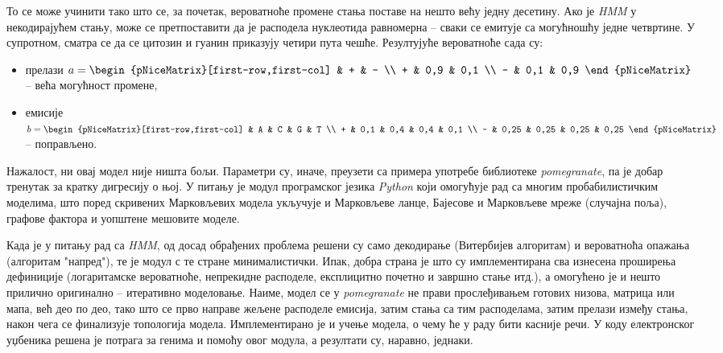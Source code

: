 \documentclass[12pt,oneside]{memoir}
\begin{document}
\begin{CJK}{UTF8}{ipxm}
То се може учинити тако што се, за почетак, вероватноће промене стања поставе на нешто већу једну десетину. Ако је \textit{HMM} у некодирајућем стању, може се претпоставити да је расподела нуклеотида равномерна -- сваки се емитује са могућношћу једне четвртине. У супротном, сматра се да се цитозин и гуанин приказују четири пута чешће. Резултујуће вероватноће сада су:
\begin{itemize}
  \item прелази $a = \begin{pNiceMatrix}[first-row,first-col] & + & - \\ + & 0,9 & 0,1 \\ - & 0,1 & 0,9 \end{pNiceMatrix}$ -- већа могућност промене,
  \item емисије $b = \begin{pNiceMatrix}[first-row,first-col] & A & C & G & T \\ + & 0,1 & 0,4 & 0,4 & 0,1 \\ - & 0,25 & 0,25 & 0,25 & 0,25 \end{pNiceMatrix}$ -- поправљено.
\end{itemize}

Нажалост, ни овај модел није ништа бољи. Параметри су, иначе, преузети са примера употребе библиотеке \textit{pomegranate}\cite{schreiber2021}, па је добар тренутак за кратку дигресију о њој. У питању је модул програмског језика \textit{Python} који омогућује рад са многим пробабилистичким моделима, што поред скривених Марковљевих модела укључује и Марковљеве ланце, Бајесове и Марковљеве мреже (случајна поља), графове фактора и уопштене мешовите моделе.

Када је у питању рад са \textit{HMM}, од досад обрађених проблема решени су само декодирање (Витербијев алгоритам) и вероватноћа опажања (алгоритам "напред"), те је модул с те стране минималистички. Ипак, добра страна је што су имплементирана сва изнесена проширења дефиниције (логаритамске вероватноће, непрекидне расподеле, експлицитно почетно и завршно стање итд.), а омогућено је и нешто прилично оригинално -- итеративно моделовање. Наиме, модел се у \textit{pomegranate} не прави прослеђивањем готових низова, матрица или мапа, већ део по део, тако што се прво направе жељене расподеле емисија, затим стања са тим расподелама, затим прелази између стања, након чега се финализује топологија модела. Имплементирано је и учење модела, о чему ће у раду бити касније речи. У коду електронског уџбеника решена је потрага за генима и помоћу овог модула, а резултати су, наравно, једнаки.


\end{CJK}
\end{document}
